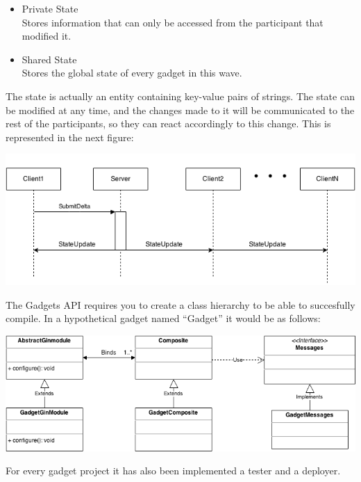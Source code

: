 \begin{itemize}
  \item Private State\\
        Stores information that can only be accessed from the participant that modified it.
  \item Shared State\\
        Stores the global state of every gadget in this wave.
\end{itemize}

The state is actually an entity containing key-value pairs of strings. The state can be modified at any time, and the changes made to it will be communicated to the rest of the participants, so they can react accordingly to this change. This is represented in the next figure:


\begin{center}
\includegraphics[keepaspectratio, scale=0.6]{Media/Diagrams/Wave/StateSequence.png}
\end{center}


The Gadgets API requires you to create a class hierarchy to be able to succesfully compile. In a hypothetical gadget named ``Gadget'' it would be as follows:

\begin{center}
\includegraphics[keepaspectratio, scale=0.5]{Media/Diagrams/Gadget/Gadget.png}
\end{center}

For every gadget project it has also been implemented a tester and a deployer.

